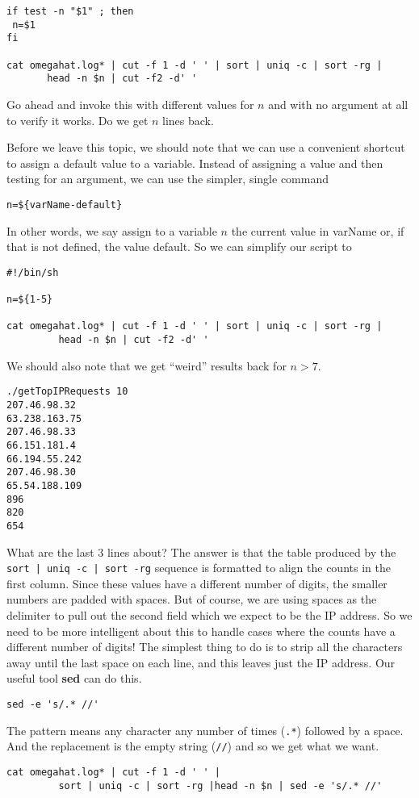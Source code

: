 \documentclass[10pt]{article}
\def\executable#1{\textbf{#1}}
\begin{document}
\begin{enumerate}
\begin{verbatim}
if test -n "$1" ; then
 n=$1
fi

cat omegahat.log* | cut -f 1 -d ' ' | sort | uniq -c | sort -rg | 
       head -n $n | cut -f2 -d' '
\end{verbatim}

Go ahead and invoke this with different values for $n$ and with no
argument at all to verify it works.
Do we get $n$  lines back.

Before we leave this topic, we should note that we can use a
convenient shortcut to assign a default value to a variable.
Instead of assigning a value and then testing for an argument,
we can use the simpler, single command
\begin{verbatim}
n=${varName-default}
\end{verbatim}
In other words, we say assign to a variable $n$ the current value
in varName or, if that is not defined, the value default.
So we can simplify our script to 
\begin{verbatim}
#!/bin/sh

n=${1-5}

cat omegahat.log* | cut -f 1 -d ' ' | sort | uniq -c | sort -rg | 
         head -n $n | cut -f2 -d' '
\end{verbatim}

We should also note that we get ``weird'' results back for $n > 7$.
\begin{verbatim}
./getTopIPRequests 10
207.46.98.32
63.238.163.75
207.46.98.33
66.151.181.4
66.194.55.242
207.46.98.30
65.54.188.109
896
820
654
\end{verbatim}
What are the last 3 lines about?
The answer is that the table produced by the
\verb+sort | uniq -c | sort -rg+ sequence
is formatted to align the counts in the first column.
Since these values have a different number of digits,
the smaller numbers are padded with spaces.
But of course, we are using spaces as the delimiter
to pull out the second field which we expect to be
the IP address.
So we need to be more intelligent about this to handle
cases where the counts have a different number of digits!
The simplest thing to do is to strip all the characters
away until the last space on each line, and this leaves just the 
IP address.
Our useful tool \executable{sed} can do this.
\begin{verbatim}
sed -e 's/.* //'
\end{verbatim}
The pattern means any character any number of times (\verb+.*+)
followed by a space. And the replacement is the empty string
(\verb+//+) and so we get what we want.
\begin{verbatim}
cat omegahat.log* | cut -f 1 -d ' ' |
         sort | uniq -c | sort -rg |head -n $n | sed -e 's/.* //'
\end{verbatim}


\end{enumerate}
\end{document}
